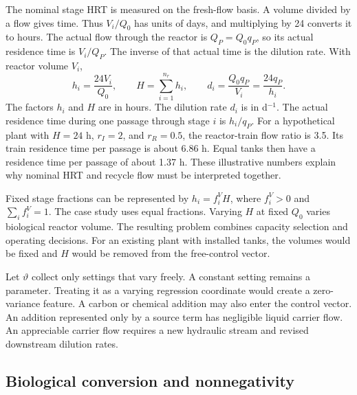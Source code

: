 The nominal stage HRT is measured on the fresh-flow basis. A volume divided by a flow gives time. Thus $V_i/Q_0$ has units of days, and multiplying by 24 converts it to hours. The actual flow through the reactor is $Q_P=Q_0q_P$, so its actual residence time is $V_i/Q_P$. The inverse of that actual time is the dilution rate. With reactor volume $V_i$,
\begin{equation}
h_i=\frac{24V_i}{Q_0},\qquad H=\sum_{i=1}^{n_r}h_i,\qquad
d_i=\frac{Q_0q_P}{V_i}=\frac{24q_P}{h_i}.
\label{eq:plant_residence}
\end{equation}
The factors $h_i$ and $H$ are in hours. The dilution rate $d_i$ is in d$^{-1}$. The actual residence time during one passage through stage $i$ is $h_i/q_P$. For a hypothetical plant with $H=24$ h, $r_I=2$, and $r_R=0.5$, the reactor-train flow ratio is 3.5. Its train residence time per passage is about 6.86 h. Equal tanks then have a residence time per passage of about 1.37 h. These illustrative numbers explain why nominal HRT and recycle flow must be interpreted together.

Fixed stage fractions can be represented by $h_i=f_i^V H$, where $f_i^V>0$ and $\sum_i f_i^V=1$. The case study uses equal fractions. Varying $H$ at fixed $Q_0$ varies biological reactor volume. The resulting problem combines capacity selection and operating decisions. For an existing plant with installed tanks, the volumes would be fixed and $H$ would be removed from the free-control vector.

Let $\vartheta$ collect only settings that vary freely. A constant setting remains a parameter. Treating it as a varying regression coordinate would create a zero-variance feature. A carbon or chemical addition may also enter the control vector. An addition represented only by a source term has negligible liquid carrier flow. An appreciable carrier flow requires a new hydraulic stream and revised downstream dilution rates.

\subsection{Biological conversion and nonnegativity}

